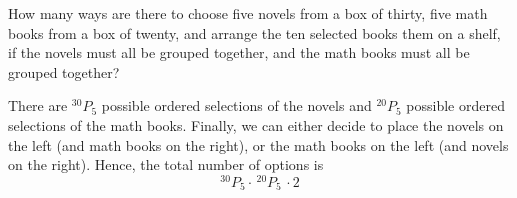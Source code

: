 \begin{example}
How many ways are there to choose five novels from a box of thirty, five math books from a box of twenty, and arrange the ten selected books them on a shelf, if the novels must all be grouped together, and the math books must all be grouped together?

There are $^{30}P_{5}$ possible ordered selections of the novels and $^{20}P_{5}$ possible ordered selections of the math books. Finally, we can either decide to place the novels on the left (and math books on the right), or the math books on the left (and novels on the right). Hence, the total number of options is
$$^{30}P_{5} \cdot\, ^{20}P_{5}\, \cdot 2$$
\end{example}





